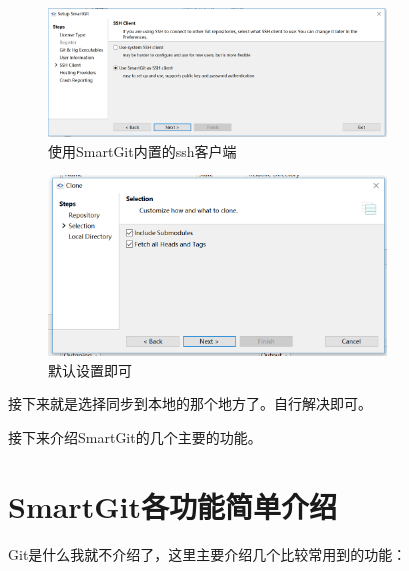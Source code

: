 \documentclass[10pt,a4paper,UTF8]{article}
\begin{document}
        \begin{figure}[H]
            \centering
            \includegraphics[width=0.8\textwidth]{ssh.PNG}
            \caption{使用SmartGit内置的ssh客户端}
        \end{figure}        

        \begin{figure}[H]
            \centering
            \includegraphics[width=0.8\textwidth]{finish.PNG}
            \caption{默认设置即可}
        \end{figure}        

        接下来就是选择同步到本地的那个地方了。自行解决即可。

        接下来介绍SmartGit的几个主要的功能。

    \newpage

    \section{SmartGit各功能简单介绍}
        Git是什么我就不介绍了，这里主要介绍几个比较常用到的功能：
\end{document}
